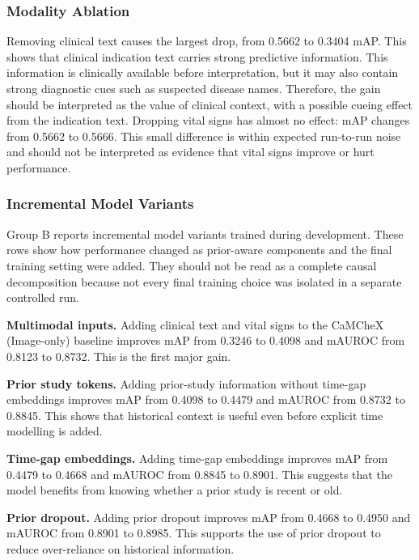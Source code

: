 \subsubsection{Modality Ablation}
\label{subsubsec:ablation_modality}

Removing clinical text causes the largest drop, from 0.5662 to 0.3404 mAP. This shows that clinical indication text carries strong predictive information. This information is clinically available before interpretation, but it may also contain strong diagnostic cues such as suspected disease names. Therefore, the gain should be interpreted as the value of clinical context, with a possible cueing effect from the indication text. Dropping vital signs has almost no effect: mAP changes from 0.5662 to 0.5666. This small difference is within expected run-to-run noise and should not be interpreted as evidence that vital signs improve or hurt performance.

\subsubsection{Incremental Model Variants}
\label{subsubsec:ablation_components}

Group B reports incremental model variants trained during development. These rows show how performance changed as prior-aware components and the final training setting were added. They should not be read as a complete causal decomposition because not every final training choice was isolated in a separate controlled run.

\textbf{Multimodal inputs.} Adding clinical text and vital signs to the CaMCheX (Image-only) baseline improves mAP from 0.3246 to 0.4098 and mAUROC from 0.8123 to 0.8732. This is the first major gain.

\textbf{Prior study tokens.} Adding prior-study information without time-gap embeddings improves mAP from 0.4098 to 0.4479 and mAUROC from 0.8732 to 0.8845. This shows that historical context is useful even before explicit time modelling is added.

\textbf{Time-gap embeddings.} Adding time-gap embeddings improves mAP from 0.4479 to 0.4668 and mAUROC from 0.8845 to 0.8901. This suggests that the model benefits from knowing whether a prior study is recent or old.

\textbf{Prior dropout.} Adding prior dropout improves mAP from 0.4668 to 0.4950 and mAUROC from 0.8901 to 0.8985. This supports the use of prior dropout to reduce over-reliance on historical information.

